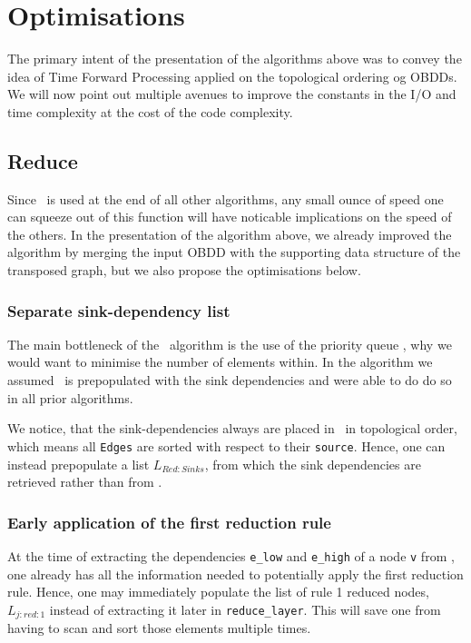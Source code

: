 \section{Optimisations} \label{sec:optimisations}
The primary intent of the presentation of the algorithms above was to convey the
idea of Time Forward Processing applied on the topological ordering og OBDDs. We
will now point out multiple avenues to improve the constants in the I/O and time
complexity at the cost of the code complexity.

\subsection{Reduce}
Since \Reduce\ is used at the end of all other algorithms, any small ounce of
speed one can squeeze out of this function will have noticable implications on
the speed of the others. In the presentation of the algorithm above, we already
improved the algorithm by merging the input OBDD with the supporting data
structure of the transposed graph, but we also propose the optimisations below.

\subsubsection{Separate sink-dependency list}
The main bottleneck of the \Reduce\ algorithm is the use of the priority queue
\ReduceQdep, why we would want to minimise the number of elements within. In the
algorithm we assumed \ReduceQdep\ is prepopulated with the sink dependencies and
were able to do do so in all prior algorithms.

We notice, that the sink-dependencies always are placed in \ReduceQdep\ in
topological order, which means all \lstinline{Edges} are sorted with respect to
their \lstinline{source}. Hence, one can instead prepopulate a list
$L_{\mathit{Red:}Sinks}$, from which the sink dependencies are retrieved rather
than from \ReduceQdep.


\subsubsection{Early application of the first reduction rule}
At the time of extracting the dependencies \lstinline{e_low} and
\lstinline{e_high} of a node \lstinline{v} from \ReduceQdep, one already has all
the information needed to potentially apply the first reduction rule. Hence, one
may immediately populate the list of rule 1 reduced nodes,
$L_{j:\mathit{red}:1}$ instead of extracting it later in
\lstinline{reduce_layer}. This will save one from having to scan and sort those
elements multiple times.

